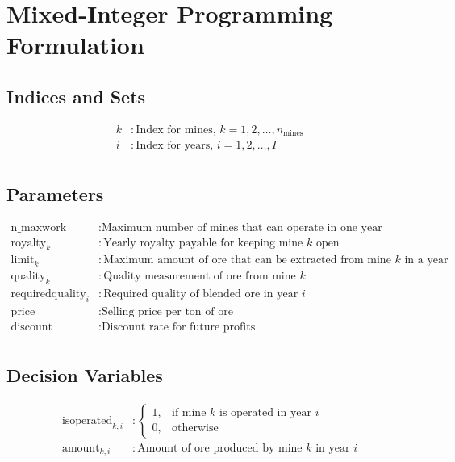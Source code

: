 \documentclass{article}
\begin{document}
\section*{Mixed-Integer Programming Formulation}

\subsection*{Indices and Sets}
\begin{align*}
k & : \text{Index for mines, } k = 1, 2, \ldots, n_{\text{mines}} \\
i & : \text{Index for years, } i = 1, 2, \ldots, I \\
\end{align*}

\subsection*{Parameters}
\begin{align*}
\text{n\_maxwork} & : \text{Maximum number of mines that can operate in one year} \\
\text{royalty}_k & : \text{Yearly royalty payable for keeping mine } k \text{ open} \\
\text{limit}_k & : \text{Maximum amount of ore that can be extracted from mine } k \text{ in a year} \\
\text{quality}_k & : \text{Quality measurement of ore from mine } k \\
\text{requiredquality}_i & : \text{Required quality of blended ore in year } i \\
\text{price} & : \text{Selling price per ton of ore} \\
\text{discount} & : \text{Discount rate for future profits} \\
\end{align*}

\subsection*{Decision Variables}
\begin{align*}
\text{isoperated}_{k,i} & : 
\begin{cases} 
1, & \text{if mine } k \text{ is operated in year } i \\
0, & \text{otherwise}
\end{cases} \\
\text{amount}_{k,i} & : \text{Amount of ore produced by mine } k \text{ in year } i \\
\end{align*}
\end{document}
